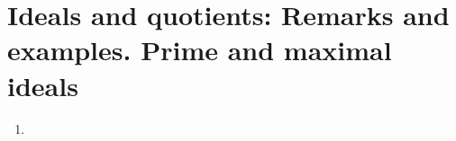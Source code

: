 \section{Ideals and quotients: Remarks and examples. Prime and maximal ideals}
\begin{enumerate}
    \item
\end{enumerate}
